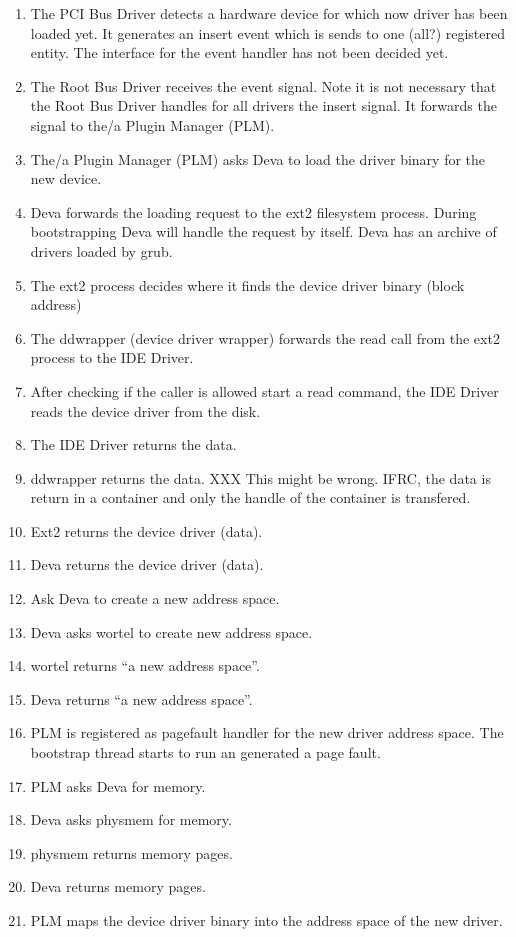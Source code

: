 \begin{enumerate}
\item The PCI Bus Driver detects a hardware device for which now driver
has been loaded yet.  It generates an insert event which is sends to
one (all?) registered entity.  The interface for the event handler has
not been decided yet.
\item The Root Bus Driver receives the event signal.  Note it is not
necessary that the Root Bus Driver handles for all drivers the insert
signal.  It forwards the signal to the/a Plugin Manager (PLM).
\item The/a Plugin Manager (PLM) asks Deva to load the driver binary
for the new device.
\item Deva forwards the loading request to the ext2 filesystem
process.  During bootstrapping Deva will handle the request by itself.
Deva has an archive of drivers loaded by grub.
\item The ext2 process decides where it finds the device driver binary
(block address)
\item The ddwrapper (device driver wrapper) forwards the read call
from the ext2 process to the IDE Driver.
\item After checking if the caller is allowed start a read command,
the IDE Driver reads the device driver from the disk.
\item The IDE Driver returns the data.
\item ddwrapper returns the data. XXX This might be wrong.  IFRC, the
data is return in a container and only the handle of the container is
transfered.
\item Ext2 returns the device driver (data).
\item Deva returns the device driver (data).
\item Ask Deva to create a new address space.
\item Deva asks wortel to create new address space.
\item wortel returns ``a new address space''.
\item Deva returns ``a new address space''.
\item PLM is registered as pagefault handler for the new driver
address space.  The bootstrap thread starts to run an generated a
page fault.
\item PLM asks Deva for memory.
\item Deva asks physmem for memory.
\item physmem returns memory pages.
\item Deva returns memory pages.
\item PLM maps the device driver binary into the address space of the
new driver.
\end{enumerate}

